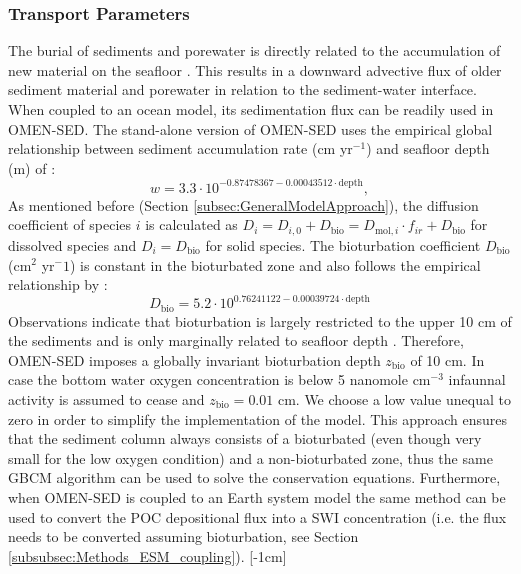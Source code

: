 \documentclass[gmd, manuscript]{copernicus}
\begin{document}
\subsubsection{Transport Parameters}
The burial of sediments and porewater is directly related to the accumulation of new material on the seafloor \citep[i.e. sedimentation,][]{burdige2006geochemistry}. 
This results in a downward advective flux of older sediment material and porewater in relation to the sediment-water interface. When coupled to an ocean model, its sedimentation flux can be readily used in OMEN-SED. 
The stand-alone version of OMEN-SED uses the empirical global relationship between sediment accumulation rate (cm yr$^{-1}$) and seafloor depth (m) of \citet{middelburg_empirical_1997}: 
\begin{equation}
 w = 3.3\cdot 10^{-0.87478367-0.00043512\cdot \text{depth}}\label{eq:sedimentation_rate},
\end{equation}
As mentioned before (Section \ref{subsec:GeneralModelApproach}), the diffusion coefficient of species $i$ is calculated as $D_i=D_{i,0}+D_{\mathrm{bio}}=D_{\mathrm{mol},i}\cdot f_{ir}+D_{\mathrm{bio}}$ for dissolved species and $D_i=D_{\mathrm{bio}}$ for solid species. 
The bioturbation coefficient $D_{\mathrm{bio}}$ (cm$^2$ yr$^-1$) is constant in the bioturbated zone and also follows the empirical relationship by \citet{middelburg_empirical_1997}:
\begin{equation}
 D_{\mathrm{bio}} = 5.2\cdot 10^{0.76241122-0.00039724\cdot \text{depth}}\label{eq:bioturbation_coeff}
\end{equation}
Observations indicate that bioturbation is largely restricted to the upper 10 cm of the sediments and is only marginally related to seafloor depth \citep[e.g.][]{boudreau_mean_1998, teal_global_2010}. 
Therefore, OMEN-SED imposes a globally invariant bioturbation depth $z_{\mathrm{bio}}$ of 10 cm. In case the bottom water oxygen concentration is below 5 nanomole cm$^{-3}$ 
infaunnal activity is assumed to cease and $z_{\mathrm{bio}} = 0.01$ cm. We choose a low value unequal to zero in order to simplify the implementation of the model. 
This approach ensures that the sediment column always consists of a bioturbated (even though very small for the low oxygen condition) and a non-bioturbated zone, 
thus the same GBCM algorithm can be used to solve the conservation equations. Furthermore, when OMEN-SED is coupled to an Earth system model 
the same method can be used to convert the POC depositional flux into a SWI concentration (i.e. the flux needs to be converted assuming bioturbation, see Section \ref{subsubsec:Methods_ESM_coupling}). 
[-1cm]%
\end{document}
